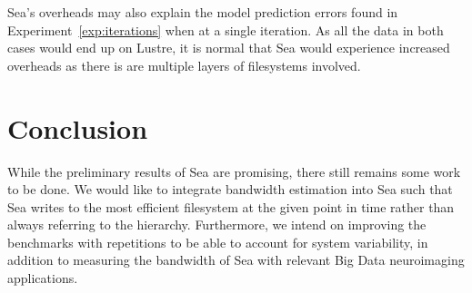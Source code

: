       Sea's overheads may also explain the                                         
      model prediction errors found in Experiment~\ref{exp:iterations} when at a single iteration.
      As all the data in both cases would end up on Lustre, it is normal that Sea would experience increased
      overheads as there is are multiple layers of filesystems involved.  
\section{Conclusion}
     While the preliminary results of Sea are promising, there still remains some work
      to be done. We would like to integrate bandwidth estimation into Sea such that
      Sea writes to the most efficient filesystem at the given point in time rather
      than always referring to the hierarchy. Furthermore, we intend on improving the benchmarks with
      repetitions to be able to account for system variability, in addition to measuring
      the bandwidth of Sea with relevant Big Data neuroimaging applications.


